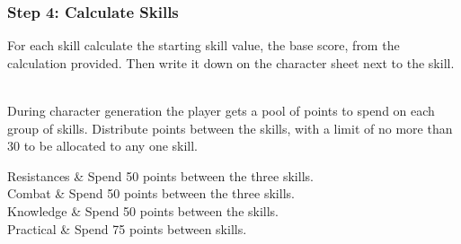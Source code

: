 


\subsubsection{Step 4: Calculate Skills}
For each skill calculate the starting skill value, the base score, from the calculation provided. Then write it down on the character sheet next to the skill.  

During character generation the player gets a pool of points to spend on each group of skills. Distribute points between the skills, with a limit of no more than 30 to be allocated to any one skill.

\begin{rpg-table}[|l|X|]
	\hline
	Resistances   & Spend 50 points between the three skills.\\
	Combat        & Spend 50 points between the three skills.\\
	Knowledge     & Spend 50 points between the skills.\\
	Practical     & Spend 75 points between skills.\\
	\hline
\end{rpg-table}

